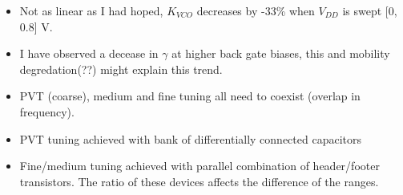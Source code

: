 


			\begin{itemize}[itemsep=4pt,label=\protect---]
				\item Not as linear as I had hoped, $K_{VCO}$ decreases by -33\% when $V_{DD}$ is swept [0, 0.8] V.
				\item I have observed a decease in $\gamma$ at higher back gate biases, this and mobility degredation(??) might explain this trend.
			\end{itemize}



			\begin{itemize}[itemsep=4pt,label=\protect---]
				\item PVT (coarse), medium and fine tuning all need to coexist (overlap in frequency).
				\item PVT tuning achieved with bank of differentially connected capacitors
				\item Fine/medium tuning achieved with parallel combination of header/footer transistors. The ratio of these devices affects the difference of the ranges.

			\end{itemize}



